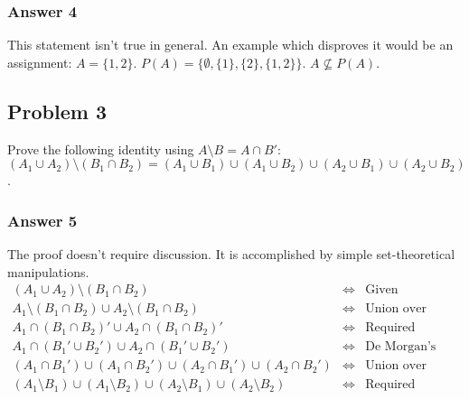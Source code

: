 \documentclass[11pt]{article}
\begin{document}
\subsubsection{Answer 4}
\label{sec-1-2-3}
This statement isn't true in general.  An example which disproves it would
be an assignment: $A=\{1, 2\}$.  $P(A)=\{\emptyset, \{1\}, \{2\}, \{1, 2\}\}$.
$A \not \subseteq P(A)$.
\subsection{Problem 3}
\label{sec-1-3}
Prove the following identity using $A \setminus B = A \cap B'$:
$(A_1 \cup A_2) \setminus (B_1 \cap B_2) = (A_1 \cup B_1) \cup (A_1 \cup B_2)
   \cup (A_2 \cup B_1) \cup (A_2 \cup B_2)$.

\subsubsection{Answer 5}
\label{sec-1-3-1}
The proof doesn't require discussion.  It is accomplished by simple
set-theoretical manipulations.
\begin{equation*}
  \begin{aligned}
    (A_1 \cup A_2) \setminus (B_1 \cap B_2) &\iff
    &\textrm{Given} \\
    A_1 \setminus (B_1 \cap B_2) \cup A_2 \setminus (B_1 \cap B_2) &\iff
    &\textrm{Union over subtraction} \\
    A_1 \cap (B_1 \cap B_2)' \cup A_2 \cap (B_1 \cap B_2)' &\iff
    &\textrm{Required identity} \\
    A_1 \cap (B_1' \cup B_2') \cup A_2 \cap (B_1' \cup B_2') &\iff
    &\textrm{De Morgan's law} \\
    (A_1 \cap B_1') \cup (A_1 \cap B_2') \cup
    (A_2 \cap B_1') \cup (A_2 \cap B_2') &\iff
    &\textrm{Union over subtraction} \\
    (A_1 \setminus B_1) \cup (A_1 \setminus B_2)
    \cup (A_2 \setminus B_1) \cup (A_2 \setminus B_2) &\iff
    &\textrm{Required identity}
  \end{aligned}
\end{equation*}
\end{document}
